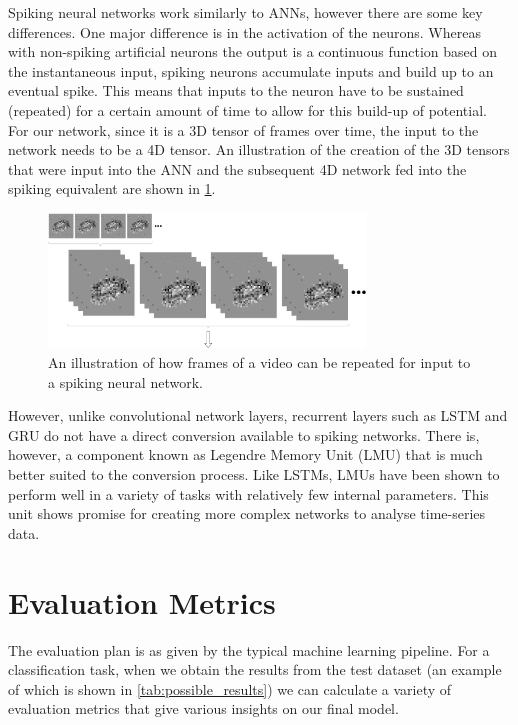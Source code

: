 Spiking neural networks work similarly to ANNs, however there are some key differences. One major difference is in the activation of the neurons. Whereas with non-spiking artificial neurons the output is a continuous function based on the instantaneous input, spiking neurons accumulate inputs and build up to an eventual spike. This means that inputs to the neuron have to be sustained (repeated) for a certain amount of time to allow for this build-up of potential. For our network, since it is a 3D tensor of frames over time, the input to the network needs to be a 4D tensor. An illustration of the creation of the 3D tensors that were input into the ANN and the subsequent 4D network fed into the spiking equivalent are shown in \cref{fig:sustained_video}.

\begin{figure}[htb]
    \centering
    \includegraphics[width=0.75\textwidth]{analysisanddesign/images/sustained_video.png}
    \caption{An illustration of how frames of a video can be repeated for input to a spiking neural network.}
    \label{fig:sustained_video}
\end{figure}

However, unlike convolutional network layers, recurrent layers such as LSTM and GRU do not have a direct conversion available to spiking networks. There is, however, a component known as Legendre Memory Unit (LMU) that is much better suited to the conversion process. Like LSTMs, LMUs have been shown to perform well in a variety of tasks with relatively few internal parameters\cite{LMU}. This unit shows promise for creating more complex networks to analyse time-series data.

\section{Evaluation Metrics} \label{sec:evalutaion_metrics}

The evaluation plan is as given by the typical machine learning pipeline\cite{IntroToML}. For a classification task, when we obtain the results from the test dataset (an example of which is shown in \cref{tab:possible_results}) we can calculate a variety of evaluation metrics that give various insights on our final model.

